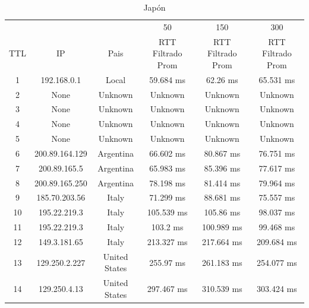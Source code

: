 \begin{table}[]
\centering
\caption{Japón}
\begin{tabular}{ | c | c | c | c | c | c | }
\hline
 &&& 50 & 150 & 300 \\ %
TTL	&         IP     &    	        Pais     &   	 RTT Filtrado Prom & 	 RTT Filtrado Prom  &	 RTT Filtrado Prom \\ \hline  
1	&192.168.0.1     &    	       Local     &   	      59.684 ms    & 	       62.26 ms     &	      65.531 ms  \\ \hline    
2	&None            &    	      Unknown    &   	      Unknown      & 	      Unknown       &	      Unknown    \\ \hline    
3	&None            &    	      Unknown    &   	      Unknown      & 	      Unknown       &	      Unknown    \\ \hline    
4	&None            &    	      Unknown    &   	      Unknown      & 	      Unknown       &	      Unknown    \\ \hline    
5	&None            &    	      Unknown    &   	      Unknown      & 	      Unknown       &	      Unknown    \\ \hline    
6	&200.89.164.129  &    	     Argentina   &   	      66.602 ms    & 	      80.867 ms     &	      76.751 ms  \\ \hline    
7	&200.89.165.5    &    	     Argentina   &   	      65.983 ms    & 	      85.396 ms     &	      77.617 ms  \\ \hline    
8	&200.89.165.250  &    	     Argentina   &   	      78.198 ms    & 	      81.414 ms     &	      79.964 ms  \\ \hline    
9	&185.70.203.56   &    	       Italy     &   	      71.299 ms    & 	      88.681 ms     &	      75.557 ms  \\ \hline    
10	&195.22.219.3    &    	       Italy     &   	     105.539 ms    & 	      105.86 ms     &	      98.037 ms  \\ \hline    
11	&195.22.219.3    &    	       Italy     &   	       103.2 ms    & 	     100.989 ms     &	      99.468 ms  \\ \hline    
12	&149.3.181.65    &    	       Italy     &   	     213.327 ms    & 	     217.664 ms     &	     209.684 ms  \\ \hline    
13	&129.250.2.227   &    	   United States &   	      255.97 ms    & 	     261.183 ms     &	     254.077 ms  \\ \hline    
14	&129.250.4.13    &    	   United States &   	     297.467 ms    & 	     310.539 ms     &	     303.424 ms  \\ \hline    

\end{tabular}
\end{table}
